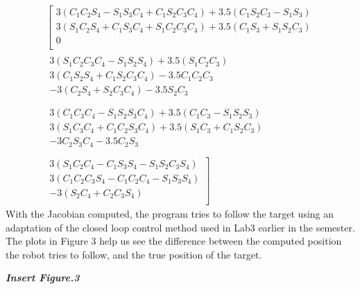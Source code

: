 \documentclass{article}
\begin{document}
\begin{multline}
 \left[
      \begin{matrix}
        3(C_1C_2S_4 - S_1S_3C_4 + C_1S_2C_3C_4) + 3.5(C_1S_2C_3 - S_1S_3)\\ 
        3(S_1C_2S_4 + C_1S_3C_4 + S_1C_2C_3C_4) + 3.5(C_1S_3 + S_1S_2C_3)\\ 
        0\\
      \end{matrix}\right.                
    \\
    \begin{matrix}
        3(S_1C_2C_3C_4 - S_1S_2S_4) + 3.5(S_1C_2C_3)\\ 
        3(C_1S_2S_4 + C_1S_2C_3C_4) - 3.5C_1C_2C_3\\ 
        -3(C_2S_4 + S_2C_3C_4) -3.5S_2C_3\\
      \end{matrix}
      \\
      \begin{matrix}
        3(C_1C_3C_4 - S_1S_2S_3C_4) + 3.5(C_1C_3 - S_1S_2S_3)\\ 
        3(S_1C_3C_4 + C_1C_2S_3C_4) + 3.5(S_1C_3 + C_1S_2C_3)\\ 
        -3C_2S_3C_4 -3.5C_2S_3\\
      \end{matrix}
      \\
      \left.
      \begin{matrix}
        3(S_1C_2C_4 - C_1S_3S_4 - S_1S_2C_3S_4)\\ 
        3(C_1C_2C_3S_4 - C_1C_2C_4 - S_1S_3S_4)\\ 
        -3(S_2C_4 + C_2C_3S_4)\\
      \end{matrix}\right]
\end{multline}
With the Jacobian computed, the program tries to follow the target using an adaptation of the closed loop control method used in Lab3 earlier in the semester. The plots in Figure 3 help us see the difference between the computed position the robot tries to follow, and the true position of the target. 

\textbf{\textit{Insert Figure.3}}
\end{document}
